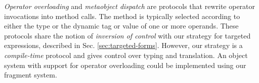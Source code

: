 \documentclass[preprint,10pt]{sigplanconf}
\begin{document}
{\it Operator overloading} \cite{vanWijngaarden:Mailloux:Peck:Koster:Sintzoff:Lindsey:Meertens:Fisker:acta:1975} and {\it metaobject dispatch} \cite{Kiczales91} are protocols that rewrite operator invocations into method calls. The method is typically selected according to either the type or the dynamic tag or value of one or more operands. These protocols share the notion of {\it inversion of control} with our strategy for targeted expressions, described in Sec. \ref{sec:targeted-forms}. However, our strategy is a {\it compile-time} protocol and gives control over typing and translation. An object system with support for operator overloading could be implemented using our fragment system. %




\end{document}
